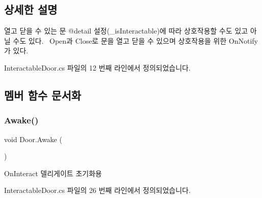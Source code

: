 \subsection{상세한 설명}
열고 닫을 수 있는 문 @detail 설정(\+\_\+is\+Interactable)에 따라 상호작용할 수도 있고 아닐 수도 있다.~\newline
Open과 Close로 문을 열고 닫을 수 있으며 상호작용을 위한 On\+Notify가 있다. 

Interactable\+Door.\+cs 파일의 12 번째 라인에서 정의되었습니다.



\subsection{멤버 함수 문서화}
\mbox{\label{class_door_a516f170e7be1fccf24a8286cdda4f8cf}} 
\subsubsection{\texorpdfstring{Awake()}{Awake()}}
{\footnotesize\ttfamily void Door.\+Awake (\begin{DoxyParamCaption}{ }\end{DoxyParamCaption})\hspace{0.3cm}{\ttfamily [private]}}



On\+Interact 델리게이트 초기화용 



Interactable\+Door.\+cs 파일의 26 번째 라인에서 정의되었습니다.


